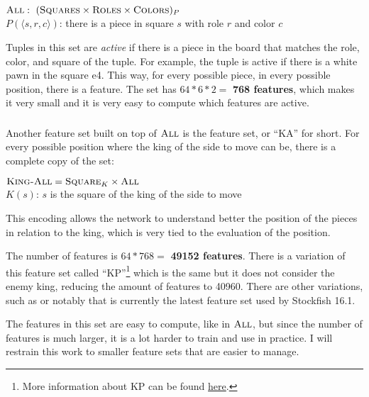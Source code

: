 \begin{center}
    $\textsc{All}:\ (\textsc{Squares} \times \textsc{Roles} \times \textsc{Colors})_{P}$ \\
    $P(\langle s, r, c \rangle)$: there is a piece in square $s$ with role $r$ and color $c$\\
\end{center}

Tuples in this set are \textit{active} if there is a piece in the board that matches the role, color, and square of the tuple. For example, the tuple  is active if there is a white pawn in the square e4. This way, for every possible piece, in every possible position, there is a feature. The set has $64*6*2=$\textbf{ 768 features}, which makes it very small and it is very easy to compute which features are active.

\subsubsection{\mdseries{}}

Another feature set built on top of $\textsc{All}$ is the  feature set, or \enquote{KA} for short. For every possible position where the king of the side to move can be, there is a complete copy of the  set:

\begin{center}
    $\textsc{King-All} = \textsc{Square}_{K} \times \textsc{All}$ \\
    $K(s)$: $s$ is the square of the king of the side to move\\
\end{center}

This encoding allows the network to understand better the position of the pieces in relation to the king, which is very tied to the evaluation of the position.

The number of features is $64*768=$ \textbf{49152 features}. There is a variation of this feature set called \enquote{KP}\footnote{More information about KP can be found \href{https://www.chessprogramming.org/Stockfish_NNUE\#HalfKP}{here}.} which is the same but it does not consider the enemy king, reducing the amount of features to 40960. There are other variations, such as  or notably  that is currently the latest feature set used by Stockfish 16.1.

The features in this set are easy to compute, like in $\textsc{All}$, but since the number of features is much larger, it is a lot harder to train and use in practice. I will restrain this work to smaller feature sets that are easier to manage.

